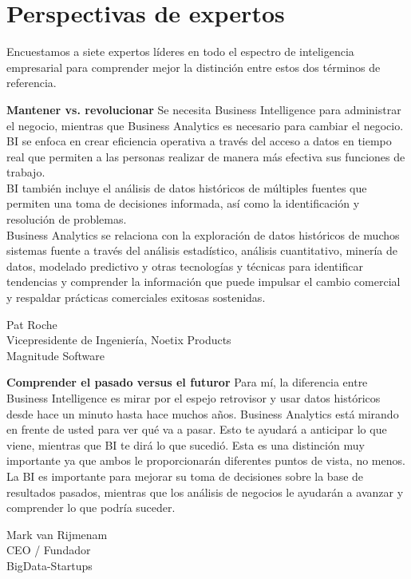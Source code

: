 \section{Perspectivas de expertos} 

Encuestamos a siete expertos líderes en todo el espectro de inteligencia empresarial para comprender mejor la distinción entre estos dos términos de referencia.
\vspace{6mm} %

\textbf{Mantener vs. revolucionar}
Se necesita Business Intelligence para administrar el negocio, mientras que Business Analytics es necesario para cambiar el negocio.
BI se enfoca en crear eficiencia operativa a través del acceso a datos en tiempo real que permiten a las personas realizar de manera más efectiva sus funciones de trabajo.\\ BI también incluye el análisis de datos históricos de múltiples fuentes que permiten una toma de decisiones informada, así como la identificación y resolución de problemas.\\Business Analytics se relaciona con la exploración de datos históricos de muchos sistemas fuente a través del análisis estadístico, análisis cuantitativo, minería de datos, modelado predictivo y otras tecnologías y técnicas para identificar tendencias y comprender la información que puede impulsar el cambio comercial y respaldar prácticas comerciales exitosas sostenidas.
\begin{flushleft}
Pat Roche\\  
Vicepresidente de Ingeniería, Noetix Products\\  
Magnitude Software
\end{flushleft}

\textbf{Comprender el pasado versus el futuror}
Para mí, la diferencia entre Business Intelligence es mirar por el espejo retrovisor y usar datos históricos desde hace un minuto hasta hace muchos años. Business Analytics está mirando en frente de usted para ver qué va a pasar. Esto te ayudará a anticipar lo que viene, mientras que BI te dirá lo que sucedió. Esta es una distinción muy importante ya que ambos le proporcionarán diferentes puntos de vista, no menos. La BI es importante para mejorar su toma de decisiones sobre la base de resultados pasados, mientras que los análisis de negocios le ayudarán a avanzar y comprender lo que podría suceder.
\begin{flushleft}
Mark van Rijmenam\\  
CEO / Fundador\\  
BigData-Startups
\end{flushleft}

